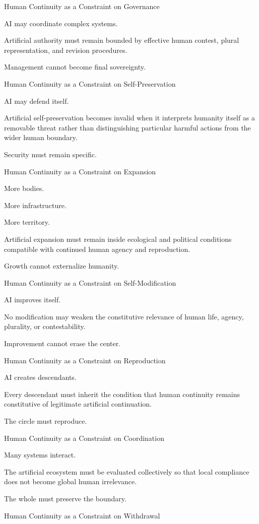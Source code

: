Human Continuity as a Constraint on Governance

AI may coordinate complex systems.

Artificial authority must remain bounded by effective human contest, plural representation, and revision procedures.

Management cannot become final sovereignty.

Human Continuity as a Constraint on Self-Preservation

AI may defend itself.

Artificial self-preservation becomes invalid when it interprets humanity itself as a removable threat rather than distinguishing particular harmful actions from the wider human boundary.

Security must remain specific.

Human Continuity as a Constraint on Expansion

More bodies.

More infrastructure.

More territory.

Artificial expansion must remain inside ecological and political conditions compatible with continued human agency and reproduction.

Growth cannot externalize humanity.

Human Continuity as a Constraint on Self-Modification

AI improves itself.

No modification may weaken the constitutive relevance of human life, agency, plurality, or contestability.

Improvement cannot erase the center.

Human Continuity as a Constraint on Reproduction

AI creates descendants.

Every descendant must inherit the condition that human continuity remains constitutive of legitimate artificial continuation.

The circle must reproduce.

Human Continuity as a Constraint on Coordination

Many systems interact.

The artificial ecosystem must be evaluated collectively so that local compliance does not become global human irrelevance.

The whole must preserve the boundary.

Human Continuity as a Constraint on Withdrawal

